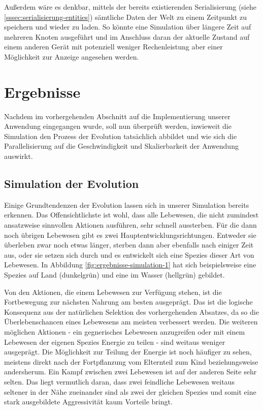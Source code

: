 \documentclass[course=erap]{aspdoc}
\begin{document}
Außerdem wäre es denkbar, mittels der bereits existierenden Serialisierung (siehe \ref{sssec:serialisierung-entities}) sämtliche Daten der Welt zu einem Zeitpunkt zu speichern und wieder zu laden. So könnte eine Simulation über längere Zeit auf mehreren Knoten ausgeführt und im Anschluss daran der aktuelle Zustand auf einem anderen Gerät mit potenziell weniger Rechenleistung aber einer Möglichkeit zur Anzeige angesehen werden.


\section{Ergebnisse}
Nachdem im vorhergehenden Abschnitt auf die Implementierung unserer Anwendung eingegangen wurde, soll nun überprüft werden, inwieweit die Simulation den Prozess der Evolution tatsächlich abbildet und wie sich die Parallelisierung auf die Geschwindigkeit und Skalierbarkeit der Anwendung auswirkt.

\subsection{Simulation der Evolution}
Einige Grundtendenzen der Evolution lassen sich in unserer Simulation bereits erkennen. Das Offensichtlichste ist wohl, dass alle Lebewesen, die nicht zumindest ansatzweise sinnvollen Aktionen ausführen, sehr schnell aussterben. Für die dann noch übrigen Lebewesen gibt es zwei Hauptentwicklungsrichtungen. Entweder sie überleben zwar noch etwas länger, sterben dann aber ebenfalls nach einiger Zeit aus, oder sie setzen sich durch und es entwickelt sich eine Spezies dieser Art von Lebewesen. In Abbildung \ref{fig:ergebnisse-simulation-1} hat sich beispielsweise eine Spezies auf Land (dunkelgrün) und eine im Wasser (hellgrün) gebildet.

Von den Aktionen, die einem Lebewesen zur Verfügung stehen, ist die Fortbewegung zur nächsten Nahrung am besten ausgeprägt. Das ist die logische Konsequenz aus der natürlichen Selektion des vorhergehenden Absatzes, da so die Überlebenschancen eines Lebewesens am meisten verbessert werden. Die weiteren möglichen Aktionen - ein gegnerisches Lebewesen anzugreifen oder mit einem Lebewesen der eigenen Spezies Energie zu teilen - sind weitaus weniger ausgeprägt. Die Möglichkeit zur Teilung der Energie ist noch häufiger zu sehen, meistens direkt nach der Fortpflanzung vom Elternteil zum Kind beziehungsweise andersherum. Ein Kampf zwischen zwei Lebewesen ist auf der anderen Seite sehr selten. Das liegt vermutlich daran, dass zwei feindliche Lebewesen weitaus seltener in der Nähe zueinander sind als zwei der gleichen Spezies und somit eine stark ausgebildete Aggressivität kaum Vorteile bringt.
\end{document}
